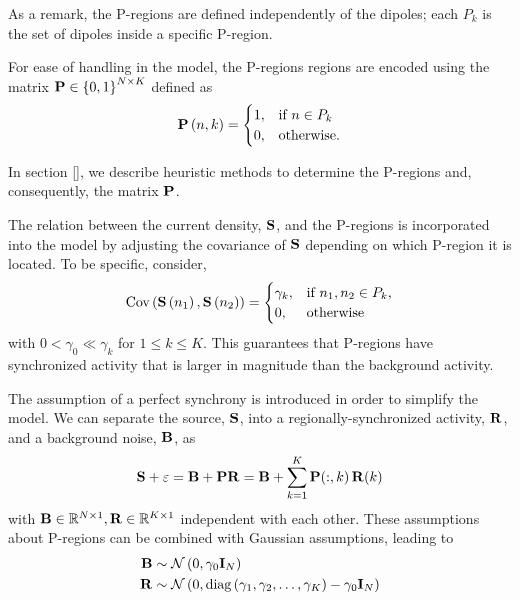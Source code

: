 As a remark, the P-regions are defined independently of the dipoles; each $P_k$ is the set of dipoles inside a specific P-region.

For ease of handling in the model, the P-regions regions are encoded using the matrix 
$\mathbf{P}\in \left\{ 0,1 \right\}^{N\times K}$ defined as
\begin{equation}
    \mathbf{P}\left( n,k \right) = \begin{cases}
        1, &\text{if } n \in P_k \\
        0, &\text{otherwise.}
    \end{cases}
\end{equation}

In section [], we describe heuristic methods to determine the P-regions and, consequently, the matrix $\mathbf{P}$.



The relation between the current density, $\mathbf{S}$, and the P-regions is incorporated into the model by adjusting the covariance of $\mathbf{S}$ depending on which P-region it is located.
%
To be specific, consider,
\begin{equation}
    \text{Cov}\left( \mathbf{S}\left( n_1 \right), \mathbf{S}\left( n_2 \right) \right) = 
    \begin{cases}
        \gamma_k, & \text{if } n_1, n_2\in P_k, \\
        0, & \text{otherwise}
    \end{cases}
\end{equation}
with $0 < \gamma_0 \ll \gamma_k$ for $1\leq k \leq K$.
%
This guarantees that P-regions have synchronized activity that is larger in magnitude than the background activity.

The assumption of a perfect synchrony is introduced in order to simplify the model.
%
We can separate the source, $\mathbf{S}$, into a regionally-synchronized activity, $\mathbf{R}$, and a background noise, $\mathbf{B}$, as
\begin{equation}
    \mathbf{S} +\varepsilon = \mathbf{B} + \mathbf{P} \mathbf{R} = \mathbf{B} + \sum_{k=1}^K \mathbf{P}(:,k)\, \mathbf{R}(k)
    \label{eq:3.4}
\end{equation}
with $\mathbf{B} \in \mathbb{R}^{N\times 1}, \mathbf{R} \in \mathbb{R}^{K\times 1}$ independent with each other.
%
These assumptions about P-regions can be combined with Gaussian assumptions, leading to 
\begin{align}
    \mathbf{B} &\sim \mathcal{N}\left( 0, \gamma_0 \mathbf{I}_N  \right) 
    \label{eq:3.5} \\
    \mathbf{R} &\sim \mathcal{N}\left( 0, \text{diag}\left( \gamma_1, \gamma_2, \dots, \gamma_K \right)-\gamma_0 \mathbf{I}_N  \right)
    \label{eq:3.6}
\end{align}

